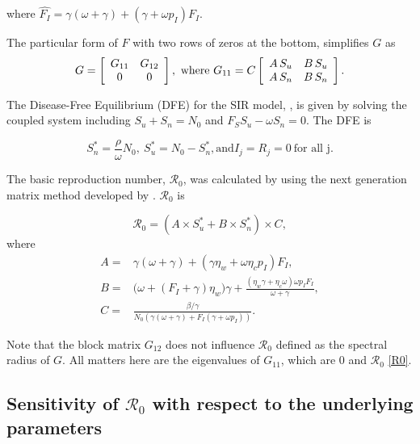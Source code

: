 \documentclass[12pt]{article}
\newcommand{\Rnum}{\mathcal{R}_0}
\theoremstyle{definition} %
\begin{document}
where $\hat{F_I}=\gamma(\omega +\gamma)+(\gamma+\omega p_I)F_I$. 


The particular form of $F$ with two rows of zeros at the bottom, simplifies $G$ as
\begin{equation}
G = \left[ \begin {array}{cc}
G_{11}&G_{12}\\
0&0
\end {array} \right], \text{ where } \\
G_{11} =C
\left[\begin {array}{cc}
A\,S_u & B\,S_u\\
A\,S_n & B\,S_n
\end {array}\right].
\end{equation}

The Disease-Free Equilibrium (DFE) for the SIR model, , is given by solving the coupled system including $S_u+S_n=N_0$ and $F_S S_u-\omega S_n=0$. The DFE is

\begin{equation}
\label{dfe}
S_n^*= \frac{\rho}{\omega} N_0, \ S_u^*= N_0-S_n^*, \text{and} I_j=R_j=0 \ \text{for all j}.
\end{equation}

The basic reproduction number, $\Rnum$, was calculated by using the next generation matrix method developed by \cite{van2002reproduction}. $\Rnum$ is

\begin{equation}
\label{R0}
\Rnum= (A \times S_u^* + B \times S_n^*) \times C,
\end{equation}
where
\begin{align*}
A=& \gamma(\omega+\gamma) + (\gamma \eta_w + \omega \eta_c p_I) F_I, \\
B=& \big(\omega+(F_I+\gamma)\eta_w\big) \gamma+\frac{(\eta_w \gamma+ \eta_c\omega) \omega p_I F_I }{\omega+\gamma}, \\
C=& \frac{\beta/\gamma}{N_0 (\gamma(\omega+\gamma)+F_I(\gamma+\omega p_I))}.
\end{align*}

Note that the block matrix $G_{12}$ does not influence $\Rnum$ defined as the spectral radius of $G$. All matters here are the eigenvalues of $G_{11}$, which are 0 and $\Rnum$ \eqref{R0}.
% 
\subsection{Sensitivity of $\Rnum$ with respect to the underlying parameters}
\end{document}
